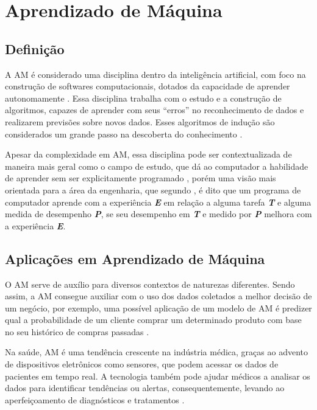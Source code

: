 \chapter{Aprendizado de Máquina}
\section{Definição}
A AM é considerado uma disciplina dentro da inteligência artificial, com foco na construção de softwares computacionais, dotados da capacidade de aprender autonomamente \cite{Hosch}. Essa disciplina trabalha com o estudo e a construção de algoritmos, capazes de aprender com seus “erros” no reconhecimento de dados e realizarem previsões sobre novos dados. Esses algoritmos de indução são considerados um grande passo na descoberta do conhecimento \cite{Kohavi}.

Apesar da complexidade em AM, essa disciplina pode ser contextualizada de maneira mais geral como o campo de estudo, que dá ao computador a habilidade de aprender sem ser explicitamente programado \cite{Arthur}, porém uma visão mais orientada para a área da engenharia, que segundo , é dito que um programa de computador aprende com a experiência \textbf{\textit{E}} em relação a alguma tarefa \textbf{\textit{T}} e alguma medida de desempenho \textbf{\textit{P}}, se seu desempenho em \textbf{\textit{T}} e medido por \textbf{\textit{P}} melhora com a experiência \textbf{\textit{E}}.

\section{Aplicações em Aprendizado de Máquina}
O AM serve de auxílio para diversos contextos de naturezas diferentes. Sendo assim, a AM consegue auxiliar com o uso dos dados coletados a melhor decisão de um negócio, por exemplo, uma possível aplicação de um modelo de AM é predizer qual a probabilidade de um cliente comprar um determinado produto com base no seu histórico de compras passadas \cite{Amazon}.

Na saúde, AM é uma tendência crescente na indústria médica, graças ao advento de dispositivos eletrônicos como sensores, que podem acessar os dados de pacientes em tempo real. A tecnologia também pode ajudar médicos a analisar os dados para identificar tendências ou alertas, consequentemente, levando ao aperfeiçoamento de diagnósticos e tratamentos \cite{Sas}.

